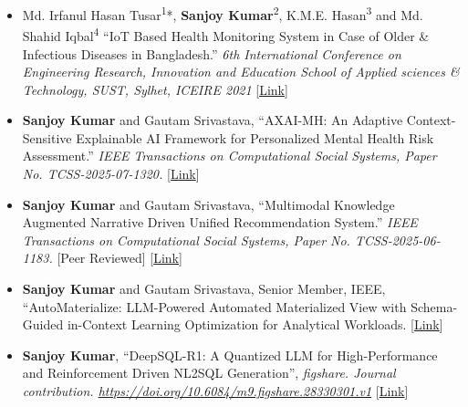 \documentclass[10pt,letterpaper]{article}
\newcommand{\lk}[2]{[\href{#1}{#2}]}
\begin{document}
\begin{itemize}
  \item Md. Irfanul Hasan Tusar\textsuperscript{1}*, \textbf{Sanjoy Kumar}\textsuperscript{2}, K.M.E. Hasan\textsuperscript{3} and Md. Shahid Iqbal\textsuperscript{4} ``IoT Based Health Monitoring System in Case of Older \& Infectious Diseases in Bangladesh.'' \textit{6th International Conference on Engineering Research, Innovation and Education School of Applied sciences \& Technology, SUST, Sylhet, ICEIRE 2021} \lk{https://drive.google.com/file/d/15x1p7n6dDvtg2hj9ObGUxymlGAqeHCxi/view?usp=sharing}{Link}
  \item \textbf{Sanjoy Kumar} and Gautam Srivastava, ``AXAI-MH: An Adaptive Context-Sensitive Explainable AI Framework for Personalized Mental Health Risk Assessment.'' \textit{IEEE Transactions on Computational Social Systems, Paper No. TCSS-2025-07-1320.} \lk{https://drive.google.com/file/d/1r5o2D66ZTg2VrMklkl8sxKoeGuwLQEVY/view?usp=sharing}{Link}
  \item \textbf{Sanjoy Kumar} and Gautam Srivastava, ``Multimodal Knowledge Augmented Narrative Driven Unified Recommendation System.'' \textit{IEEE Transactions on Computational Social Systems, Paper No. TCSS-2025-06-1183.} [Peer Reviewed] \lk{https://drive.google.com/file/d/1NxOR6ds-d3xFB5gi_pmYLFTv_YaVoGMo/view?usp=sharing}{Link}
  \item \textbf{Sanjoy Kumar} and Gautam Srivastava, Senior Member, IEEE, ``AutoMaterialize: LLM-Powered Automated Materialized View with Schema-Guided in-Context Learning Optimization for Analytical Workloads. \lk{https://drive.google.com/file/d/1ueDIfEE3TNvnEfAcWhqCBkrGW8HlX74C/view?usp=sharing}{Link}
  \item \textbf{Sanjoy Kumar}, ``DeepSQL-R1: A Quantized LLM for High-Performance and Reinforcement Driven NL2SQL Generation'', \textit{figshare. Journal contribution. \href{https://doi.org/10.6084/m9.figshare.28330301.v1}{https://doi.org/10.6084/m9.figshare.28330301.v1}} \lk{https://figshare.com/articles/journal_contribution/DeepSQL-R1_A_Quantized_LLM_for_High-Performance_and_Reinforcement_Driven_NL2SQL_Generation/28330301/1?file=52091795}{Link}
\end{itemize}

\end{document}
